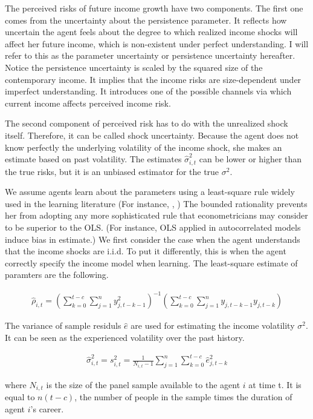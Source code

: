\documentclass[12pt,notitlepage,onecolumn,aps,pra]{article}
\begin{document}
The perceived risks of future income growth have two components. The
first one comes from the uncertainty about the persistence parameter. It
reflects how uncertain the agent feels about the degree to which
realized income shocks will affect her future income, which is
non-existent under perfect understanding. I will refer to this as the
parameter uncertainty or persistence uncertainty hereafter. Notice the
persistence uncertainty is scaled by the squared size of the
contemporary income. It implies that the income risks are size-dependent
under imperfect understanding. It introduces one of the possible
channels via which current income affects perceived income risk.

The second component of perceived risk has to do with the unrealized
shock itself. Therefore, it can be called shock uncertainty. Because the
agent does not know perfectly the underlying volatility of the income
shock, she makes an estimate based on past volatility. The estimates
\(\hat{\sigma}^2_{i,t}\) can be lower or higher than the true risks, but
it is an unbiased estimator for the true \(\sigma^2\).

We assume agents learn about the parameters using a least-square rule
widely used in the learning literature (For instance,
\cite{evans2012learning}, \cite{malmendier2015learning}) The bounded
rationality prevents her from adopting any more sophisticated rule that
econometricians may consider to be superior to the OLS. (For instance,
OLS applied in autocorrelated models induce bias in estimate.) We first
consider the case when the agent understands that the income shocks are
i.i.d. To put it differently, this is when the agent correctly specify
the income model when learning. The least-square estimate of paramters
are the following.

\begin{eqnarray}
\hat \rho_{i,t} = (\sum^{t-c}_{k=0}\sum^{n}_{j=1}y^2_{j,t-k-1})^{-1}(\sum^{t-c}_{k=0}\sum^{n}_{j=1}y_{j,t-k-1}y_{j,t-k})
\end{eqnarray}

The variance of sample residuls \(\widehat e\) are used for estimating
the income volatility \(\sigma^2\). It can be seen as the experienced
volatility over the past history.

\begin{eqnarray}
\widehat{\sigma}^2_{i,t} = s^2_{i,t} = \frac{1}{N_{i,t}-1} \sum^{n}_{j=1}\sum^{t-c}_{k=0} \hat e_{j,t-k}^2
\end{eqnarray}

where \(N_{i,t}\) is the size of the panel sample available to the agent
\(i\) at time t. It is equal to \(n(t-c)\), the number of people in the
sample times the duration of agent \(i\)'s career.
\end{document}
